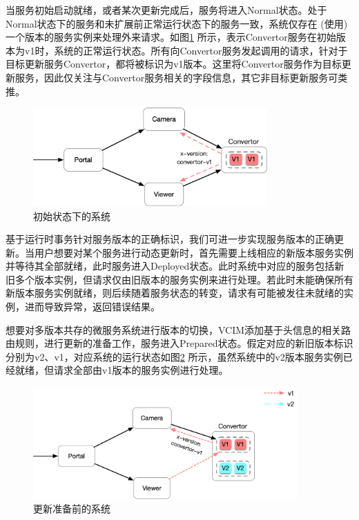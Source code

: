 \documentclass[macfonts,master]{njuthesis}
\begin{document}
当服务初始启动就绪，或者某次更新完成后，服务将进入Normal状态。处于Normal状态下的服务和未扩展前正常运行状态下的服务一致，系统仅存在 (使用) 一个版本的服务实例来处理外来请求。如图\ref{fig:convertor_normal_v1} 所示，表示Convertor服务在初始版本为v1时，系统的正常运行状态。所有向Convertor服务发起调用的请求，针对于目标更新服务Convertor，都将被标识为v1版本。这里将Convertor服务作为目标更新服务，因此仅关注与Convertor服务相关的字段信息，其它非目标更新服务可类推。

\begin{figure}[!htbp]
  \centering
  \includegraphics[width= 0.8\textwidth]{image/convertor_normal_v1.png}
  \caption{初始状态下的系统}
  \label{fig:convertor_normal_v1}
\end{figure}

基于运行时事务针对服务版本的正确标识，我们可进一步实现服务版本的正确更新。当用户想要对某个服务进行动态更新时，首先需要上线相应的新版本服务实例并等待其全部就绪，此时服务进入Deployed状态。此时系统中对应的服务包括新旧多个版本实例，但请求仅由旧版本的服务实例来进行处理。若此时未能确保所有新版本服务实例就绪，则后续随着服务状态的转变，请求有可能被发往未就绪的实例，进而导致异常，返回错误结果。

想要对多版本共存的微服务系统进行版本的切换，VCIM添加基于头信息的相关路由规则，进行更新的准备工作，服务进入Prepared状态。假定对应的新旧版本标识分别为v2、v1，对应系统的运行状态如图\ref{fig:convertor_prepared_v1v2} 所示，虽然系统中的v2版本服务实例已经就绪，但请求全部由v1版本的服务实例进行处理。

\begin{figure}[!htbp]
  \centering
  \includegraphics[width= 0.9\textwidth]{image/convertor_prepared_v1v2.png}
  \caption{更新准备前的系统}
  \label{fig:convertor_prepared_v1v2}
\end{figure}
\end{document}
